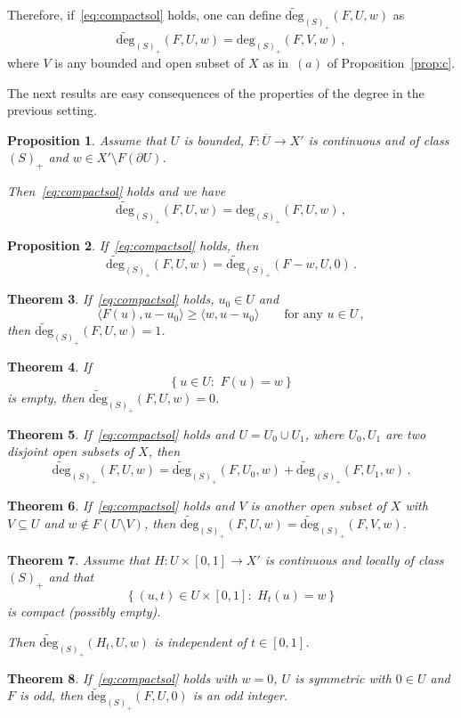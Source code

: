 \documentclass[twoside,reqno]{amsart}
\numberwithin{equation}{section}
\newtheorem{thm}{Theorem}[section]
\newtheorem{prop}[thm]{Proposition}
\theoremstyle{definition}
\newcommand{\cl}[1]{\overline{#1}}
\begin{document}
%
Therefore, if~\eqref{eq:compactsol} holds, one can define
$\widetilde{\mathrm{deg}}_{(S)_+}(F,U,w)$ as
\[
\widetilde{\mathrm{deg}}_{(S)_+}(F,U,w) =
\mathrm{deg}_{(S)_+}(F,V,w)\,,
\]
where $V$ is any bounded and open subset of $X$ as in~$(a)$
of Proposition~\ref{prop:c}.
\par
The next results are easy consequences of the properties
of the degree in the previous setting. 
%
\begin{prop}
Assume that $U$ is bounded, $F:\cl{U}\rightarrow X'$ is 
continuous and of class~$(S)_+$ and 
$w\in X'\setminus F(\partial U)$.
\par
Then~\eqref{eq:compactsol} holds and we have
\[
\widetilde{\mathrm{deg}}_{(S)_+}(F,U,w) =
\mathrm{deg}_{(S)_+}(F,U,w)\,,
\]
\end{prop}
%
\begin{prop}
If~\eqref{eq:compactsol} holds, then
\[
\widetilde{\mathrm{deg}}_{(S)_+}(F,U,w) = 
\widetilde{\mathrm{deg}}_{(S)_+}(F-w,U,0)\,.
\]
\end{prop}
%
\begin{thm}
\label{thm:normalizationc}
If~\eqref{eq:compactsol} holds, $u_0\in U$ and
\[
\langle F(u),u-u_0\rangle \geq \langle w,u-u_0\rangle
\qquad\text{for any $u\in U$}\,,
\]
then $\widetilde{\mathrm{deg}}_{(S)_+}(F,U,w) = 1$.
\end{thm}
%
\begin{thm}
\label{thm:existencec}
If 
\[
\left\{u\in U:\,\,F(u)=w\right\}
\]
is empty, then $\widetilde{\mathrm{deg}}_{(S)_+}(F,U,w) = 0$.
\end{thm}
%
\begin{thm}
\label{thm:additivityc}
If~\eqref{eq:compactsol} holds
and $U=U_0\cup U_1$, where $U_0, U_1$ are two disjoint open
subsets of $X$, then
\[
\widetilde{\mathrm{deg}}_{(S)_+}(F,U,w) =
\widetilde{\mathrm{deg}}_{(S)_+}(F,U_0,w) + 
\widetilde{\mathrm{deg}}_{(S)_+}(F,U_1,w) \,.
\]
\end{thm}
%
\begin{thm}
\label{thm:excisionc}
If~\eqref{eq:compactsol} holds and $V$ is another open 
subset of $X$ with $V\subseteq U$ and
$w\not\in F(U\setminus V)$,
then $\widetilde{\mathrm{deg}}_{(S)_+}(F,U,w) = 
\widetilde{\mathrm{deg}}_{(S)_+}(F,V,w)$.
\end{thm}
%
\begin{thm}
\label{thm:homotopyc}
Assume that $H:U\times[0,1]\rightarrow X'$
is continuous and locally of class~$(S)_+$
and that
\[
\left\{(u,t)\in U\times[0,1]:\,\,
H_t(u)=w\right\}
\]
is compact (possibly empty).
\par
Then $\widetilde{\mathrm{deg}}_{(S)_+}(H_{t},U,w)$ is 
independent of $t\in[0,1]$.
\end{thm}
%
\begin{thm}
\label{thm:oddc}
If~\eqref{eq:compactsol} holds with $w=0$, $U$ is 
symmetric with $0\in U$ and $F$ is odd, then
$\widetilde{\mathrm{deg}}_{(S)_+}(F,U,0)$
is an odd integer.
\end{thm}
%
\end{document}

